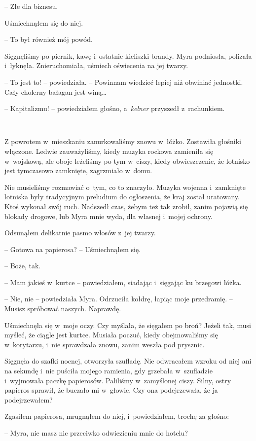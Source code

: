 \documentclass[oneside,polish,11pt,sfheadings]{mwbk}
\begin{document}
-- Złe dla biznesu.

Uśmiechnąłem się do niej.

-- To był również mój powód.

Sięgnęliśmy po piernik, kawę i~ostatnie kieliszki brandy. Myra
podniosła, polizała i~łyknęła. Znieruchomiała, uśmiech oświecenia na jej
twarzy.

-- To jest to! -- powiedziała. -- Powinnam wiedzieć lepiej niż obwiniać
jednostki. Cały cholerny bałagan jest winą\ldots

-- Kapitalizmu! -- powiedziałem głośno, a~\emph{kelner} przyszedł z~rachunkiem.

~

Z powrotem w~mieszkaniu zanurkowaliśmy znowu w~łóżko. Zostawiła głośniki
włączone. Ledwie zauważyliśmy, kiedy muzyka rockowa zamieniła się w~wojskową, ale oboje leżeliśmy po tym w~ciszy, kiedy obwieszczenie, że
lotnisko jest tymczasowo zamknięte, zagrzmiało w~domu.

Nie musieliśmy rozmawiać o~tym, co to znaczyło. Muzyka wojenna i~zamknięte lotniska były tradycyjnym preludium do ogłoszenia, że kraj
został uratowany. Ktoś wykonał swój ruch. Nadszedł czas, żebym też tak
zrobił, zanim pojawią się blokady drogowe, lub Myra mnie wyda, dla
własnej i~mojej ochrony.

Odsunąłem delikatnie pasmo włosów z~jej twarzy.

-- Gotowa na papierosa? -- Uśmiechnąłem się.

-- Boże, tak.

-- Mam jakieś w~kurtce -- powiedziałem, siadając i~sięgając ku brzegowi
łóżka.

-- Nie, nie -- powiedziała Myra. Odrzuciła kołdrę, łapiąc moje przedramię.
-- Musisz spróbować naszych. Naprawdę.

Uśmiechnęła się w~moje oczy. Czy myślała, że sięgałem po broń? Jeżeli
tak, musi myśleć, że ciągle jest kurtce. Musiała poczuć, kiedy
obejmowaliśmy się w~korytarzu, i~nie sprawdzała znowu, zanim weszła pod
prysznic.

Sięgnęła do szafki nocnej, otworzyła szufladę. Nie odwracałem wzroku od
niej ani na sekundę i~nie puściła mojego ramienia, gdy grzebała w~szufladzie i~wyjmowała paczkę papierosów. Paliliśmy w~zamyślonej ciszy.
Silny, ostry papieros sprawił, że buczało mi w~głowie. Czy ona
podejrzewała, że ja podejrzewałem?

Zgasiłem papierosa, mrugnąłem do niej, i~powiedziałem, trochę za
głośno: 

-- Myra, nie masz nic przeciwko odwiezieniu mnie do hotelu?
\end{document}
